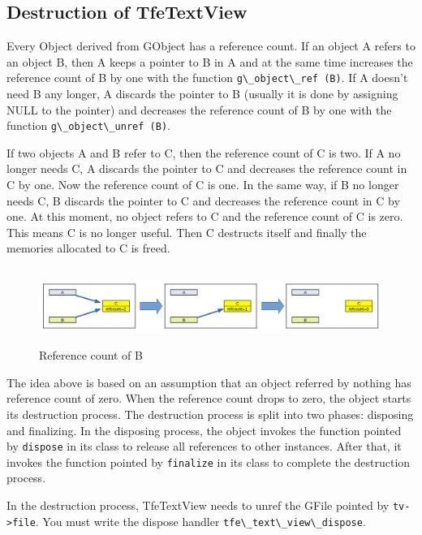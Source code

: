 \subsection{Destruction of
TfeTextView}\label{destruction-of-tfetextview}

Every Object derived from GObject has a reference count. If an object A
refers to an object B, then A keeps a pointer to B in A and at the same
time increases the reference count of B by one with the function
\passthrough{\lstinline!g\_object\_ref (B)!}. If A doesn't need B any
longer, A discards the pointer to B (usually it is done by assigning
NULL to the pointer) and decreases the reference count of B by one with
the function \passthrough{\lstinline!g\_object\_unref (B)!}.

If two objects A and B refer to C, then the reference count of C is two.
If A no longer needs C, A discards the pointer to C and decreases the
reference count in C by one. Now the reference count of C is one. In the
same way, if B no longer needs C, B discards the pointer to C and
decreases the reference count in C by one. At this moment, no object
refers to C and the reference count of C is zero. This means C is no
longer useful. Then C destructs itself and finally the memories
allocated to C is freed.

\begin{figure}
\centering
\includegraphics[width=15.855cm,height=2.475cm]{../image/refcount.png}
\caption{Reference count of B}
\end{figure}

The idea above is based on an assumption that an object referred by
nothing has reference count of zero. When the reference count drops to
zero, the object starts its destruction process. The destruction process
is split into two phases: disposing and finalizing. In the disposing
process, the object invokes the function pointed by
\passthrough{\lstinline!dispose!} in its class to release all references
to other instances. After that, it invokes the function pointed by
\passthrough{\lstinline!finalize!} in its class to complete the
destruction process.

In the destruction process, TfeTextView needs to unref the GFile pointed
by \passthrough{\lstinline!tv->file!}. You must write the dispose
handler \passthrough{\lstinline!tfe\_text\_view\_dispose!}.

